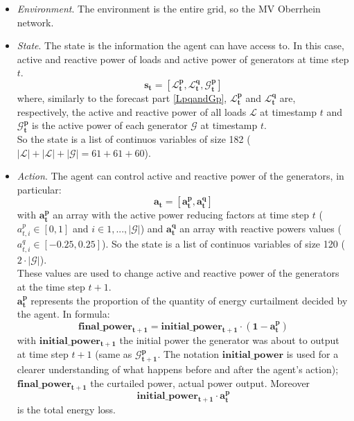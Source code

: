 \begin{itemize}
    \item \emph{Environment}. The environment is the entire grid, so the MV Oberrhein network.
    
    \item \emph{State}. The state is the information the agent can have access to. In this case, active and reactive power of loads and active power of generators at time step $t$. \\
    \[
        \mathbf{s_t} = [\mathbf{\mathcal{L}^p_{t}},                             \mathbf{\mathcal{L}^q_{t}},                             \mathbf{\mathcal{G}^p_{t}}]
    \]
    \noindent where, similarly to the forecast part \ref{LpqandGp}, $\mathbf{\mathcal{L}^p_{t}}$ and $\mathbf{\mathcal{L}^q_{t}}$ are, respectively, the active and reactive power of all loads $\mathcal{L}$ at timestamp $t$ and $\mathbf{\mathcal{G}^p_{t}}$ is the active power of each generator $\mathcal{G}$ at timestamp $t$.\\
    So the state is a list of continuos variables of size 182 ($|\mathcal{L}|+|\mathcal{L}|+|\mathcal{G}| = 61 + 61 + 60$).

    \item \emph{Action}. The agent can control active and reactive power of the generators, in particular:
    \[
        \mathbf{a_t} = [\mathbf{a^p_t}, \mathbf{a^q_t}]
    \]
    with $\mathbf{a^p_t}$ an array with the active power reducing factors at time step $t$ ($a^p_{t,i} \in [0,1]$ and $i \in {1, ..., |\mathcal{G}|}$) and $\mathbf{a^q_t}$ an array with reactive powers values ($a^q_{t,i} \in [-0.25,0.25]$). So the state is a list of continuos variables of size 120 ($2 \cdot |\mathcal{G}|$).\\
    
    These values are used to change active and reactive power of the generators at the time step $t+1$.\\
    $\mathbf{a^p_t}$ represents the proportion of the quantity of energy curtailment decided by the agent. In formula:
    \[
        \mathbf{final\_power_{t+1}} = \mathbf{initial\_power_{t+1}} \cdot (\mathbf{1}-\mathbf{a^p_t})
    \]
    \noindent with $\mathbf{initial\_power_{t+1}}$ the initial power the generator was about to output at time step ${t+1}$ (same as $\mathbf{\mathcal{G}^p_{t+1}}$. The notation $\mathbf{initial\_power}$ is used for a clearer understanding of what happens before and after the agent's action); $\mathbf{final\_power_{t+1}}$ the curtailed power, actual power output. Moreover
    \[
        \mathbf{initial\_power_{t+1}} \cdot \mathbf{a^p_t}
    \]
    \noindent is the total energy loss.\\
    

\end{itemize}
